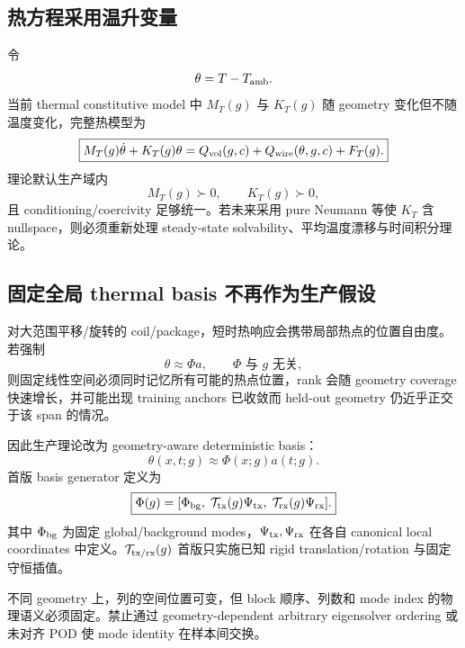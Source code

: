 \subsection{热方程采用温升变量}
令
\begin{equation}
\theta=T-T_{\rm amb}.
\end{equation}
当前 thermal constitutive model 中 $M_T(g)$ 与 $K_T(g)$ 随 geometry 变化但不随温度变化，完整热模型为
\begin{equation}
\boxed{
M_T(g)\dot\theta+K_T(g)\theta
=Q_{\rm vol}(g,c)+Q_{\rm wire}(\theta,g,c)+F_T(g).
}
\end{equation}
理论默认生产域内
\begin{equation}
M_T(g)\succ0,\qquad K_T(g)\succ0,
\end{equation}
且 conditioning/coercivity 足够统一。若未来采用 pure Neumann 等使 $K_T$ 含 nullspace，则必须重新处理 steady-state solvability、平均温度漂移与时间积分理论。

\subsection{固定全局 thermal basis 不再作为生产假设}
对大范围平移/旋转的 coil/package，短时热响应会携带局部热点的位置自由度。若强制
\begin{equation}
\theta\approx\Phi a,\qquad \Phi\text{ 与 }g\text{ 无关},
\end{equation}
则固定线性空间必须同时记忆所有可能的热点位置，rank 会随 geometry coverage 快速增长，并可能出现 training anchors 已收敛而 held-out geometry 仍近乎正交于该 span 的情况。

因此生产理论改为 geometry-aware deterministic basis：
\begin{equation}
\boxed{
\theta(x,t;g)\approx\Phi(x;g)a(t;g).
}
\end{equation}
首版 basis generator 定义为
\begin{equation}
\boxed{
\Phi(g)=
[\Phi_{\rm bg},\;\mathcal T_{\rm tx}(g)\Psi_{\rm tx},\;\mathcal T_{\rm rx}(g)\Psi_{\rm rx}].
}
\end{equation}
其中 $\Phi_{\rm bg}$ 为固定 global/background modes，$\Psi_{\rm tx},\Psi_{\rm rx}$ 在各自 canonical local coordinates 中定义。$\mathcal T_{\rm tx/rx}(g)$ 首版只实施已知 rigid translation/rotation 与固定守恒插值。

不同 geometry 上，列的空间位置可变，但 block 顺序、列数和 mode index 的物理语义必须固定。禁止通过 geometry-dependent arbitrary eigensolver ordering 或未对齐 POD 使 mode identity 在样本间交换。

